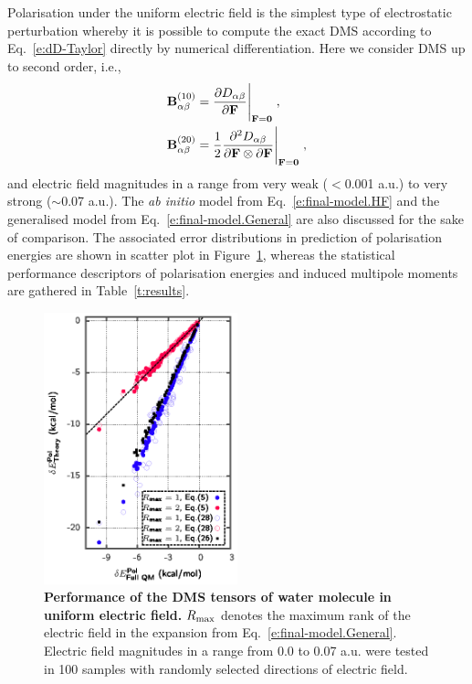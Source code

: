 \documentclass[aip,amsmath,amssymb,reprint,floatfix]{revtex4-1}
\begin{document}
Polarisation under the uniform electric field is the simplest type of electrostatic perturbation
whereby it is possible to compute the exact DMS according to Eq.~\eqref{e:dD-Taylor} 
directly by numerical differentiation. Here we consider DMS up to second order, i.e.,
%
\begin{subequations}\label{e:exact-DMS}
 \begin{align}
  {\bf B}^{(10)}_{\alpha\beta} &= \frac{\partial D_{\alpha\beta}}{\partial {\bf F}}\Bigg|_{{\bf F}={\bf 0}} \;, \label{e:B10} \\
  {\bf B}^{(20)}_{\alpha\beta} &= \frac{1}{2} 
     \frac{\partial^2 D_{\alpha\beta}}{\partial {\bf F} \otimes \partial {\bf F}}\Bigg|_{{\bf F}={\bf 0}} \;, \label{e:B20}
 \end{align}
\end{subequations}
%
and electric field magnitudes in a range from very weak ($<$0.001 a.u.) to very strong ($\sim$0.07 a.u.).
The \emph{ab initio} model from Eq.~\eqref{e:final-model.HF} and
the generalised model from Eq.~\eqref{e:final-model.General} are also discussed for the sake of comparison. 
The associated error distributions in prediction of polarisation energies 
are shown in scatter plot in Figure~\ref{f:fig-1}, whereas the
statistical performance descriptors of polarisation energies and induced multipole moments
are gathered in Table~\ref{t:results}.
%
\begin{figure}[t]
\includegraphics[width=0.5\textwidth]{fig-1.eps}
\caption{\label{f:fig-1} {\bf Performance of the DMS tensors of water molecule
in uniform electric field.} 
$R_{\rm max}$ denotes the maximum rank of the electric field
in the expansion from Eq.~\eqref{e:final-model.General}.
Electric field magnitudes in a range from 0.0 to 0.07 a.u. were tested in 100 samples with randomly selected 
directions of electric field.
} 
\end{figure}
%
\end{document}
